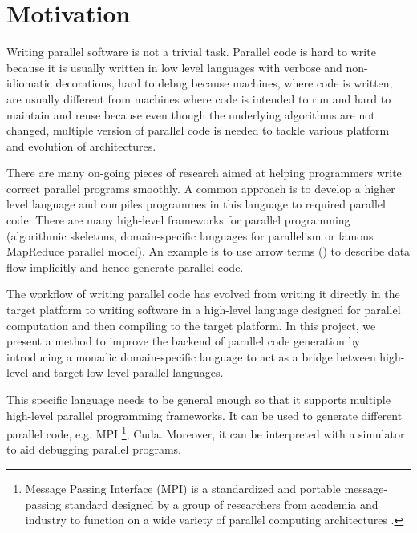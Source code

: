 \section{Motivation} \label{i:m}
Writing parallel software is not a trivial task. Parallel code is hard to write because it is usually written in low level languages with verbose and non-idiomatic decorations, hard to debug because machines, where code is written, are usually different from machines where code is intended to run and hard to maintain and reuse because even though the underlying algorithms are not changed, multiple version of parallel code is needed to tackle various platform and evolution of architectures.

There are many on-going pieces of research aimed at helping programmers write correct parallel programs smoothly. A common approach is to develop a higher level language and compiles programmes in this language to required parallel code. There are many high-level frameworks for parallel programming (\eg algorithmic skeletons\cite{coleAlgorithmicSkeletonsStructured}, domain-specific languages for parallelism\cite{brownHeterogeneousParallelFramework2011} or famous MapReduce parallel model\cite{liMapReduceParallelProgramming2016}). An example is to use arrow terms () to describe data flow implicitly and hence generate parallel code.

The workflow of writing parallel code has evolved from writing it directly in the target platform to writing software in a high-level language designed for parallel computation and then compiling to the target platform. In this project, we present a method to improve the backend of parallel code generation by introducing a monadic domain-specific language to act as a bridge between high-level and target low-level parallel languages.

This specific language needs to be general enough so that it supports multiple high-level parallel programming frameworks. It can be used to generate different parallel code, e.g. MPI \footnote{Message Passing Interface (MPI) is a standardized and portable message-passing standard designed by a group of researchers from academia and industry to function on a wide variety of parallel computing architectures \cite{MessagePassingInterface2018}.}, Cuda. Moreover, it can be interpreted with a simulator to aid debugging parallel programs.


